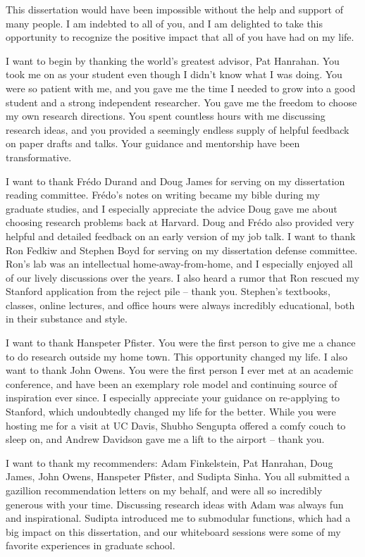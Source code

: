 
This dissertation would have been impossible without the help and support of many people.
I am indebted to all of you, and I am delighted to take this opportunity to recognize the positive impact that all of you have had on my life.

I want to begin by thanking the world's greatest advisor, Pat Hanrahan.
You took me on as your student even though I didn't know what I was doing.
You were so patient with me, and you gave me the time I needed to grow into a good student and a strong independent researcher.
You gave me the freedom to choose my own research directions.
You spent countless hours with me discussing research ideas, and you provided a seemingly endless supply of helpful feedback on paper drafts and talks.
Your guidance and mentorship have been transformative.

I want to thank Fr{\'e}do Durand and Doug James for serving on my dissertation reading committee.
Fr{\'e}do's notes on writing became my bible during my graduate studies, and I especially appreciate the advice Doug gave me about choosing research problems back at Harvard.
Doug and Fr{\'e}do also provided very helpful and detailed feedback on an early version of my job talk. I want to thank Ron Fedkiw and Stephen Boyd for serving on my dissertation defense committee.
Ron's lab was an intellectual home-away-from-home, and I especially enjoyed all of our lively discussions over the years.
I also heard a rumor that Ron rescued my Stanford application from the reject pile -- thank you.
Stephen's textbooks, classes, online lectures, and office hours were always incredibly educational, both in their substance and style.

I want to thank Hanspeter Pfister.
You were the first person to give me a chance to do research outside my home town.
This opportunity changed my life.
I also want to thank John Owens.
You were the first person I ever met at an academic conference, and have been an exemplary role model and continuing source of inspiration ever since.
I especially appreciate your guidance on re-applying to Stanford, which undoubtedly changed my life for the better.
While you were hosting me for a visit at UC Davis, Shubho Sengupta offered a comfy couch to sleep on, and Andrew Davidson gave me a lift to the airport -- thank you.

I want to thank my recommenders:
Adam Finkelstein, Pat Hanrahan, Doug James, John Owens, Hanspeter Pfister, and Sudipta Sinha.
You all submitted a gazillion recommendation letters on my behalf, and were all so incredibly generous with your time.
Discussing research ideas with Adam was always fun and inspirational.
Sudipta introduced me to submodular functions, which had a big impact on this dissertation, and our whiteboard sessions were some of my favorite experiences in graduate school.


